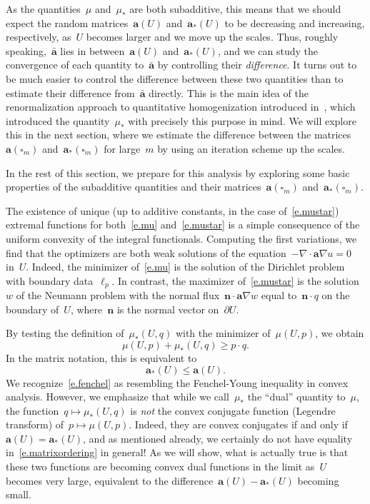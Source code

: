 \documentclass[11pt,twoside]{article} %
\let\oldsquare\square %
\renewcommand{\square}{\oldsquare}
\numberwithin{equation}{section}
\theoremstyle{definition}
\renewcommand{\a}{\mathbf{a}}
\newcommand{\ahom}{\bar{\a}}
\newcommand{\cu}{\square}
\begin{document}
\smallskip 

As the quantities~$\mu$ and~$\mu_*$ are both subadditive, this means that we should expect the random matrices~$\a(U)$ and~$\a_*(U)$ to be decreasing and increasing, respectively, as~$U$ becomes larger and we move up the scales. Thus, roughly speaking,~$\ahom$ lies in between~$\a(U)$ and~$\a_*(U)$, and we can study the convergence of each quantity to~$\ahom$ by controlling their \emph{difference}. It turns out to be much easier to control the difference between these two quantities than to estimate their difference from~$\ahom$ directly.
This is the main idea of the renormalization approach to quantitative homogenization introduced in~\cite{AS}, which introduced the quantity~$\mu_*$ with precisely this purpose in mind. 
We will explore this in the next section, where we estimate the difference between the matrices~$\a(\cu_m)$ and~$\a_*(\cu_m)$ for large~$m$ by using an iteration scheme up the scales.

\smallskip

In the rest of this section, we prepare for this analysis by exploring some basic properties of the subadditive quantities and their matrices~$\a(\cu_m)$ and~$\a_*(\cu_m)$.

\smallskip

The existence of unique (up to additive constants, in the case of~\eqref{e.mustar}) extremal functions for both~\eqref{e.mu} and~\eqref{e.mustar} is a simple consequence of the uniform convexity of the integral functionals. Computing the first variations, we find that the optimizers are both weak solutions of the equation~$-\nabla \cdot \a \nabla u=0$ in~$U$. Indeed, the minimizer of~\eqref{e.mu} is the solution of the Dirichlet problem with boundary data~$\ell_p$. In contrast, the maximizer of~\eqref{e.mustar} is the solution~$w$ of the Neumann problem with the normal flux~$\mathbf{n} \cdot \a\nabla w$ equal to~$\mathbf{n} \cdot q$ on the boundary of~$U$, where~$\mathbf{n}$ is the normal vector on~$\partial U$.   

\smallskip

By testing the definition of~$\mu_*(U,q)$ with the minimizer of~$\mu(U,p)$, we obtain
\begin{equation}
\label{e.fenchel}
\mu(U,p) + \mu_*(U,q) \geq p\cdot q. 
\end{equation}
In the matrix notation, this is equivalent to 
\begin{equation}
\label{e.matrixordering}
\a_*(U) \leq \a(U) .
\end{equation}
We recognize~\eqref{e.fenchel} as resembling the Fenchel-Young inequality in convex analysis. 
However, we emphasize that while we call~$\mu_*$ the ``dual'' quantity to~$\mu$, the function~$q\mapsto \mu_*(U,q)$ is \emph{not} the convex conjugate function (Legendre transform)  of~$p \mapsto \mu(U,p)$. Indeed, they are convex conjugates if and only if~$\a(U) = \a_*(U)$, and as mentioned already, we certainly do not have equality in~\eqref{e.matrixordering} in general! As we will show, what is actually true is that these two functions are becoming convex dual functions in the limit as~$U$ becomes very large, equivalent to the difference~$\a(U) - \a_*(U)$ becoming small. 
\end{document}
